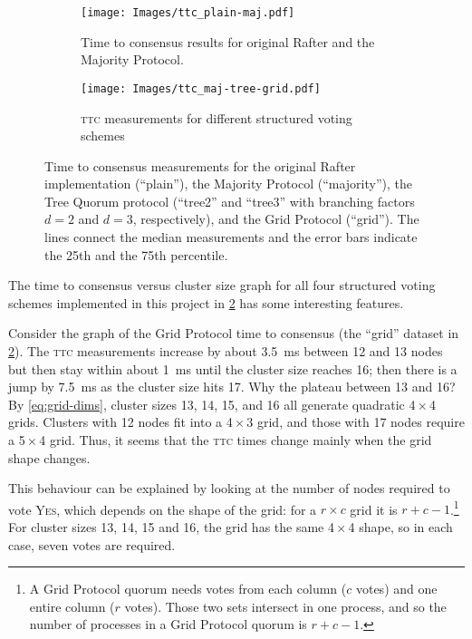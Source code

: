 \documentclass[12pt,chapterprefix=true,toc=bibliography,numbers=noendperiod,
               footnotes=multiple,twoside]{scrreprt}
\newcommand{\yes}{{\fontfamily{jkposn}\selectfont\textsc{Yes}}}
\begin{document}
\begin{figure}[p]
    \begin{subfigure}{1\textwidth}
        \centering
        \texttt{[image: Images/ttc\_plain-maj.pdf]}
        \caption{Time to consensus results for original Rafter and the Majority Protocol.}
        \label{fig:plain-maj-ttc}
    \end{subfigure}

    \begin{subfigure}{1\textwidth}
        \centering
        \texttt{[image: Images/ttc\_maj-tree-grid.pdf]}
        \caption{\textsc{ttc} measurements for different structured voting schemes}
        \label{fig:maj-tree-grid-ttc}
    \end{subfigure}
    \caption{Time to consensus measurements for the original Rafter implementation (\enquote{plain}), the Majority Protocol (\enquote{majority}), the Tree Quorum protocol (\enquote{tree2} and \enquote{tree3} with branching factors \(d = 2\) and \(d = 3\), respectively), and the Grid Protocol (\enquote{grid}). The lines connect the median measurements and the error bars indicate the 25th and the 75th percentile.}
    \label{fig:ttc}
\end{figure}

The time to consensus versus cluster size graph for all four structured voting schemes implemented in this project in \cref{fig:maj-tree-grid-ttc} has some interesting features.

Consider the graph of the Grid Protocol time to consensus (the \enquote{grid} dataset in \cref{fig:maj-tree-grid-ttc}). The \textsc{ttc} measurements increase by about \SI{3.5}{\milli\second} between 12 and 13 nodes but then stay within about \SI{1}{\milli\second} until the cluster size reaches 16; then there is a jump by \SI{7.5}{\milli\second} as the cluster size hits 17. Why the plateau between 13 and 16? By \cref{eq:grid-dims}, cluster sizes 13, 14, 15, and 16 all generate quadratic 4\,\(\times\)\,4 grids. Clusters with 12 nodes fit into a 4\,\(\times\)\,3 grid, and those with 17 nodes require a 5\,\(\times\)\,4 grid. Thus, it seems that the \textsc{ttc} times change mainly when the grid shape changes.

This behaviour can be explained by looking at the number of nodes required to vote \yes, which depends on the shape of the grid: for a \(r \times c\) grid it is \(r + c - 1\).\footnote{A Grid Protocol quorum needs votes from each column  (\(c\) votes) and one entire column (\(r\) votes). Those two sets intersect in one process, and so the number of processes in a Grid Protocol quorum is \(r + c - 1\).} For cluster sizes 13, 14, 15 and 16, the grid has the same 4\,\(\times\)\,4 shape, so in each case, seven votes are required.
\end{document}

